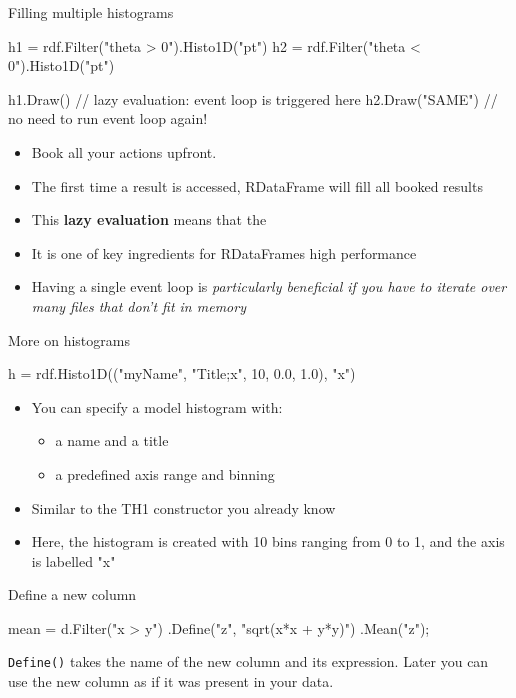\documentclass[aspectratio=169]{beamer}
\begin{document}
\begin{frame}[fragile]{Filling multiple histograms}
    \begin{pycell}
h1 = rdf.Filter("theta > 0").Histo1D("pt")
h2 = rdf.Filter("theta < 0").Histo1D("pt")

h1.Draw()       // lazy evaluation: event loop is triggered here
h2.Draw("SAME") // no need to run event loop again!
    \end{pycell}
    \begin{itemize}
        \item Book all your actions upfront.
        \item The first time a result is accessed, RDataFrame will fill all booked results
        \item This \textbf{lazy evaluation} means that the {}
        \item It is one of key ingredients for RDataFrames high performance
        \item Having a single event loop is \textit{particularly beneficial if you have to iterate over many files that don't fit in memory}
    \end{itemize}
\end{frame}

\begin{frame}[fragile]{More on histograms}
    \begin{pycell}
        h = rdf.Histo1D(("myName", "Title;x", 10, 0.0, 1.0), "x")
    \end{pycell}
    \begin{itemize}
        \item You can specify a model histogram with:
        \begin{itemize}
            \item a name and a title
            \item a predefined axis range and binning
        \end{itemize}
        \item Similar to the TH1 constructor you already know
        \item Here, the histogram is created with 10 bins ranging from 0 to 1, and the axis is labelled "x"
    \end{itemize}
\end{frame}

\begin{frame}[fragile]{Define a new column}
\begin{pycell}
mean = d.Filter("x > y")
        .Define("z", "sqrt(x*x + y*y)")
        .Mean("z");
\end{pycell}
\texttt{Define()} takes the name of the new column and its
expression. Later you can use the new column as if it
was present in your data.
\end{frame}
\end{document}
